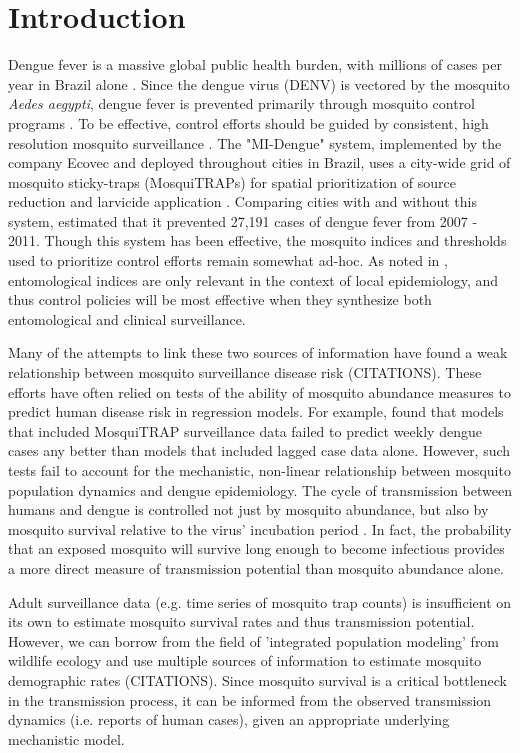 \documentclass[10pt,letterpaper]{article}
\begin{document}
\linenumbers

\section*{Introduction}

Dengue fever is a massive global public health burden, with millions of cases per year in Brazil alone \cite{Bhatt2013}.  
Since the dengue virus (DENV) is vectored by the mosquito \textit{Aedes aegypti}, dengue fever is prevented primarily through mosquito control programs \cite{Achee2015}.
To be effective, control efforts should be guided by consistent, high resolution mosquito surveillance \cite{Morrison2008}.
The "MI-Dengue" system, implemented by the company Ecovec and deployed throughout cities in Brazil, uses a city-wide grid of mosquito sticky-traps (MosquiTRAPs) for spatial prioritization of source reduction and larvicide application \cite{Eiras2009}.
Comparing cities with and without this system, \cite{Pepin2013} estimated that it prevented 27,191 cases of dengue fever from 2007 - 2011.
Though this system has been effective, the mosquito indices and thresholds used to prioritize control efforts remain somewhat ad-hoc.
As noted in \cite{Morrison2008}, entomological indices are only relevant in the context of local epidemiology, and thus control policies will be most effective when they synthesize both entomological and clinical surveillance.

Many of the attempts to link these two sources of information have found a weak relationship between mosquito surveillance disease risk (CITATIONS).
These efforts have often relied on tests of the ability of mosquito abundance measures to predict human disease risk in regression models.
For example, \cite{Pepin2015} found that models that included MosquiTRAP surveillance data failed to predict weekly dengue cases any better than models that included lagged case data alone.
However, such tests fail to account for the mechanistic, non-linear relationship between mosquito population dynamics and dengue epidemiology.
The cycle of transmission between humans and dengue is controlled not just by mosquito abundance, but also by mosquito survival relative to the virus' incubation period \cite{Achee2015}.
In fact, the probability that an exposed mosquito will survive long enough to become infectious provides a more direct measure of transmission potential than mosquito abundance alone.

Adult surveillance data (e.g. time series of mosquito trap counts) is insufficient on its own to estimate mosquito survival rates and thus transmission potential.
However, we can borrow from the field of 'integrated population modeling' from wildlife ecology and use multiple sources of information to estimate mosquito demographic rates (CITATIONS).
Since mosquito survival is a critical bottleneck in the transmission process, it can be informed from the observed transmission dynamics (i.e. reports of human cases), given an appropriate underlying mechanistic model.
\end{document}
